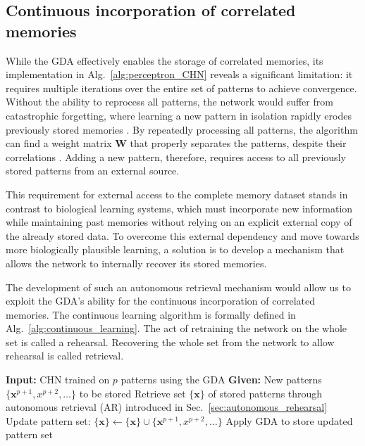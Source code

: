 \documentclass[10pt,letterpaper]{article}
\begin{document}
\subsection{Continuous incorporation of correlated memories}
\label{sec:CL}
While the GDA effectively enables the storage of correlated memories, its implementation in Alg.~\ref{alg:perceptron_CHN} 
reveals a significant limitation: it requires multiple iterations over the entire set of patterns to achieve convergence. Without the ability to reprocess all patterns, the network would suffer from catastrophic forgetting, where learning a new pattern in isolation rapidly erodes previously stored memories \cite{mccloskey_catastrophic_1989, robins_catastrophic_1995, kirkpatrick_overcoming_2017, shen_reducing_2023}.
By repeatedly processing all patterns, the algorithm can find a weight matrix \textbf{W} that properly separates the patterns,
despite their correlations \cite{diederich_learning_1987}.
Adding a new pattern, therefore, requires access to all previously stored patterns from an external source. 

This requirement for external access to the complete memory dataset stands in contrast to biological learning systems, which must incorporate new information while maintaining past memories without relying on an explicit external copy of the already stored data.
To overcome this external dependency and move towards more biologically plausible
learning, a solution is to develop a mechanism that allows the network to internally recover its stored memories. 

The development of such an
autonomous retrieval mechanism would allow us to exploit the GDA's ability for the continuous incorporation of correlated
memories. The continuous learning algorithm is formally defined in Alg.~\ref{alg:continuous_learning}. The act of retraining the network on the whole set is called a rehearsal. Recovering the whole set from the network to allow rehearsal is called retrieval. 

\begin{algorithm}[h]
\caption{Continuous incorporation of correlated patterns through rehearsal of the whole memory set}
\begin{algorithmic}[1]
\State \textbf{Input:} CHN trained on $p$ patterns using the GDA
\State \textbf{Given:} New patterns $\{\mathbf{x}^{p+1},x^{p+2},\dots\}$ to be stored
\State Retrieve set $\{\mathbf{x}\}$ of stored patterns through autonomous retrieval (AR) introduced in Sec.~\ref{sec:autonomous_rehearsal}
\State Update pattern set: $\{\mathbf{x}\} \leftarrow \{\mathbf{x}\} \cup \{\mathbf{x}^{p+1},x^{p+2},\dots\}$
\State Apply GDA to store updated pattern set
\end{algorithmic}
\label{alg:continuous_learning}
\end{algorithm}
\newpage
\end{document}
